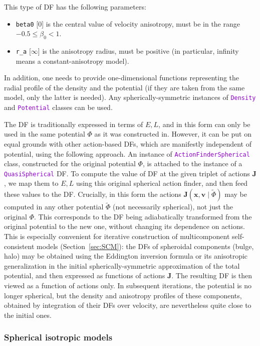 \documentclass[12pt]{article}
\newcommand{\ttt}[1]{\textcolor{darkviolet}{\texttt{#1}}}
\newcommand{\ppp}[1]{\textcolor{darkolive} {\texttt{#1}}}
\newcommand{\bv}{\boldsymbol{v}}
\newcommand{\bx}{\boldsymbol{x}}
\newcommand{\bJ}{\boldsymbol{J}}
\begin{document}
This type of DF has the following parameters:
\begin{itemize}
\item \ppp{beta0} [0]  is the central value of velocity anisotropy, must be in the range $-0.5 \le \beta_0 < 1$.
\item \ppp{r_a} [$\infty$]  is the anisotropy radius, must be positive (in particular, infinity means a constant-anisotropy model).
\end{itemize}
In addition, one needs to provide one-dimensional functions representing the radial profile of the density and the potential (if they are taken from the same model, only the latter is needed). Any spherically-symmetric instances of \ttt{Density} and \ttt{Potential} classes can be used.

The DF is traditionally expressed in terms of $E,L$, and in this form can only be used in the same potential $\Phi$ as it was constructed in. However, it can be put on equal grounds with other action-based DFs, which are manifestly independent of potential, using the following approach.
An instance of \ttt{ActionFinderSpherical} class, constructed for the original potential $\Phi$, is attached to the instance of a \ttt{QuasiSpherical} DF. To compute the value of DF at the given triplet of actions $\bJ$, we map them to $E,L$ using this original spherical action finder, and then feed these values to the DF. Crucially, in this form the actions $\bJ(\bx,\bv \;|\;\tilde\Phi)$ may be computed in any other potential $\tilde\Phi$ (not necessarily spherical), not just the original $\Phi$. This corresponds to the DF being adiabatically transformed from the original potential to the new one, without changing its dependence on actions.
This is especially convenient for iterative construction of multicomponent self-consistent models (Section~\ref{sec:SCM}): the DFs of spheroidal components (bulge, halo) may be obtained using the Eddington inversion formula or its anisotropic generalization in the initial spherically-symmetric approximation of the total potential, and then expressed as functions of actions $\bJ$. The resulting DF is then viewed as a function of actions only. In subsequent iterations, the potential is no longer spherical, but the density and anisotropy profiles of these components, obtained by integration of their DFs over velocity, are nevertheless quite close to the initial ones.


\subsubsection{Spherical isotropic models}  \label{sec:DFsphericalIsotropic}
\end{document}
